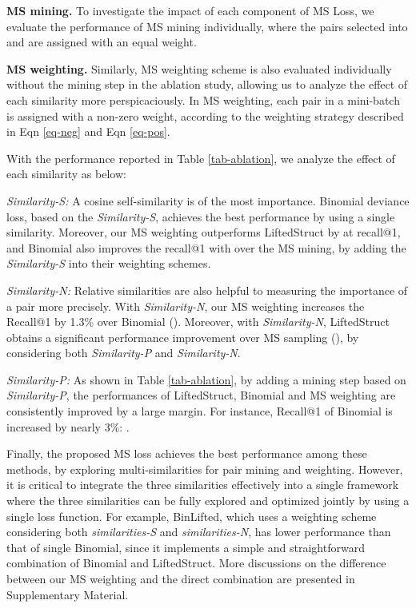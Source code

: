\documentclass[10pt,twocolumn,letterpaper]{article}
\begin{document}
{\bf MS mining.} To investigate the impact of each component of MS Loss, we evaluate the performance of MS mining individually, where the pairs selected into  and  are assigned with an equal weight.

{\bf MS weighting.} Similarly, MS weighting scheme is also evaluated individually without the mining step in the ablation study, allowing us to analyze the effect of each similarity more perspicaciously. In MS weighting, each pair in a mini-batch is assigned with a non-zero weight, according to the weighting strategy described in Eqn \ref{eq-neg} and Eqn \ref{eq-pos}.
 
With the performance reported in Table \ref{tab-ablation}, we analyze the effect of each similarity as below:

{\it Similarity-S:} A cosine self-similarity is of the most importance. Binomial deviance loss, based on the {\it Similarity-S}, achieves the best performance by using a single similarity. Moreover, our MS weighting outperforms LiftedStruct by  at recall@1, and  Binomial also improves the recall@1 with  over the MS mining,  by adding the {\it Similarity-S} into their weighting schemes. 

{\it Similarity-N:} Relative similarities are also helpful to measuring the importance of a pair more precisely. With {\it Similarity-N}, our MS weighting increases the Recall@1 by 1.3\% over Binomial (). Moreover, with {\it Similarity-N}, LiftedStruct obtains a significant performance improvement over MS sampling (), by considering both {\it Similarity-P} and {\it Similarity-N}.

{\it Similarity-P:} As shown in Table \ref{tab-ablation}, by adding a mining step based on {\it Similarity-P}, the performances of LiftedStruct, Binomial and MS weighting are consistently improved by a large margin. For instance, Recall@1 of Binomial is increased by nearly 3\%: .  

Finally, the proposed MS loss achieves the best performance among these methods, by exploring multi-similarities for pair mining and weighting. However, it is critical to integrate the three similarities effectively into a single framework where the three similarities can be fully explored and optimized jointly by using a single loss function. For example, BinLifted, which uses a weighting scheme considering both {\it similarities-S} and {\it similarities-N}, has lower performance than that of single Binomial, since it implements a simple and straightforward combination of Binomial and LiftedStruct. More discussions on the difference between our MS weighting and the direct combination are presented in Supplementary Material. 
\end{document}
